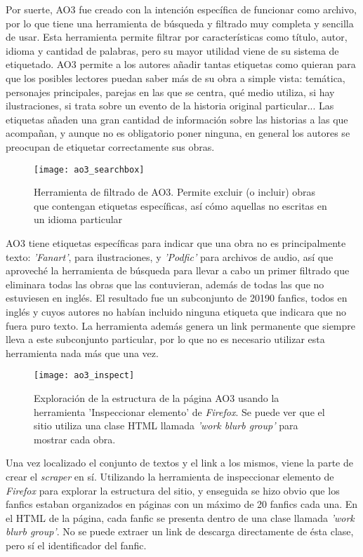 \documentclass{pre-tfg}
\begin{document}
Por suerte, AO3 fue creado con la intención específica de funcionar como archivo, por lo que tiene una herramienta de búsqueda y filtrado muy completa y sencilla de usar. Esta herramienta permite filtrar por características como título, autor, idioma y cantidad de palabras, pero su mayor utilidad viene de su sistema de etiquetado. AO3 permite a los autores añadir tantas etiquetas como quieran para que los posibles lectores puedan saber más de su obra a simple vista: temática, personajes principales, parejas en las que se centra, qué medio utiliza, si hay ilustraciones, si trata sobre un evento de la historia original particular... Las etiquetas añaden una gran cantidad de información sobre las historias a las que acompañan, y aunque no es obligatorio poner ninguna, en general los autores se preocupan de etiquetar correctamente sus obras.

\begin{SCfigure}
	\caption{Herramienta de filtrado de AO3. Permite excluir (o incluir) obras que contengan etiquetas específicas, así cómo aquellas no escritas en un idioma particular}
	\label{fig:ao3_search}
	\texttt{[image: ao3\_searchbox]}
	\centering
\end{SCfigure}

AO3 tiene etiquetas específicas para indicar que una obra no es principalmente texto: \textit{'Fanart'}, para ilustraciones, y \textit{'Podfic'} para archivos de audio, así que aproveché la herramienta de búsqueda para llevar a cabo un primer filtrado que eliminara todas las obras que las contuvieran, además de todas las que no estuviesen en inglés. El resultado fue un subconjunto de 20190 fanfics, todos en inglés y cuyos autores no habían incluido ninguna etiqueta que indicara que no fuera puro texto. La herramienta además genera un link permanente que siempre lleva a este subconjunto particular, por lo que no es necesario utilizar esta herramienta nada más que una vez.

\begin{figure}
	\texttt{[image: ao3\_inspect]}
	\caption{Exploración de la estructura de la página AO3 usando la herramienta 'Inspeccionar elemento' de \textit{Firefox}. Se puede ver que el sitio utiliza una clase HTML llamada \textit{'work blurb group'} para mostrar cada obra.}
	\label{fig:ao3_inspect}
	\centering
\end{figure} 

Una vez localizado el conjunto de textos y el link a los mismos, viene la parte de crear el \textit{scraper} en sí. Utilizando la herramienta de inspeccionar elemento de \textit{Firefox} para explorar la estructura del sitio, y enseguida se hizo obvio que los fanfics estaban organizados en páginas con un máximo de 20 fanfics cada una. En el HTML de la página, cada fanfic se presenta dentro de una clase llamada \textit{'work blurb group'}. No se puede extraer un link de descarga directamente de ésta clase, pero sí el identificador del fanfic.
\end{document}
